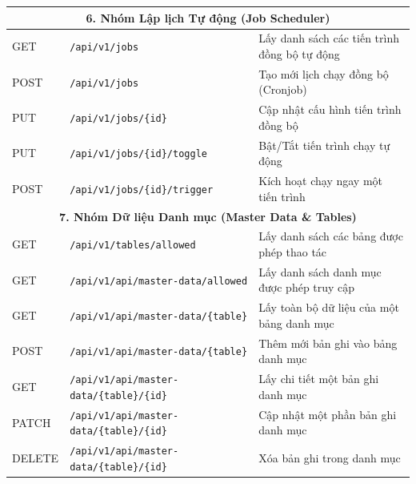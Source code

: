 \begin{longtable}{|p{1.5cm}|p{8cm}|p{5.8cm}|}
\multicolumn{3}{|c|}{\textbf{6. Nhóm Lập lịch Tự động (Job Scheduler)}} \\ \hline
GET & \texttt{/api/v1/jobs} & Lấy danh sách các tiến trình đồng bộ tự động \\ \hline
POST & \texttt{/api/v1/jobs} & Tạo mới lịch chạy đồng bộ (Cronjob) \\ \hline
PUT & \texttt{/api/v1/jobs/\{id\}} & Cập nhật cấu hình tiến trình đồng bộ \\ \hline
PUT & \texttt{/api/v1/jobs/\{id\}/toggle} & Bật/Tắt tiến trình chạy tự động \\ \hline
POST & \texttt{/api/v1/jobs/\{id\}/trigger} & Kích hoạt chạy ngay một tiến trình \\ \hline

\multicolumn{3}{|c|}{\textbf{7. Nhóm Dữ liệu Danh mục (Master Data \& Tables)}} \\ \hline
GET & \texttt{/api/v1/tables/allowed} & Lấy danh sách các bảng được phép thao tác \\ \hline
GET & \texttt{/api/v1/api/master-data/allowed} & Lấy danh sách danh mục được phép truy cập \\ \hline
GET & \texttt{/api/v1/api/master-data/\{table\}} & Lấy toàn bộ dữ liệu của một bảng danh mục \\ \hline
POST & \texttt{/api/v1/api/master-data/\{table\}} & Thêm mới bản ghi vào bảng danh mục \\ \hline
GET & \texttt{/api/v1/api/master-data/\{table\}/\{id\}} & Lấy chi tiết một bản ghi danh mục \\ \hline
PATCH & \texttt{/api/v1/api/master-data/\{table\}/\{id\}} & Cập nhật một phần bản ghi danh mục \\ \hline
DELETE & \texttt{/api/v1/api/master-data/\{table\}/\{id\}} & Xóa bản ghi trong danh mục \\ \hline


\end{longtable}

